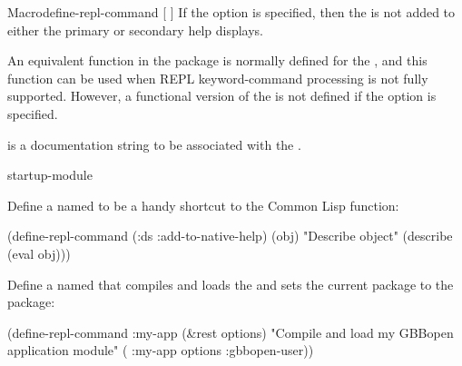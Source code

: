 \documentclass[10pt,twoside,english,pdftex]{article}
\begin{document}
\begin{functiondoc}{Macro}{define-repl-command}{ [\superstar{} \vbar{}
     ] \superstar}
If the  option is specified, then the  is not
added to either the primary or secondary help displays.

An equivalent function in the  package is normally
defined for the  , and this
function can be used when REPL keyword-command processing is not fully
supported.  However, a  functional version of the
 is not defined if the  option is
specified.

 is a documentation string to be associated
with the  .

\begin{alsos}{startup-module}
\end{alsos}

\fnexamples
Define a  named  to be a handy
shortcut to the Common Lisp  function:
%
\W\supp
\begin{example}
  (define-repl-command (:ds :add-to-native-help) (obj)
    "Describe object"
    (describe (eval obj)))
\end{example}

Define a  named  that compiles and loads the
  and sets the current package to the
 package:
%
\W\supp
\begin{example}
  (define-repl-command :my-app (&rest options)
    "Compile and load my GBBopen application module"
    ( :my-app options :gbbopen-user))
\end{example} 

\end{functiondoc}

\end{document}
